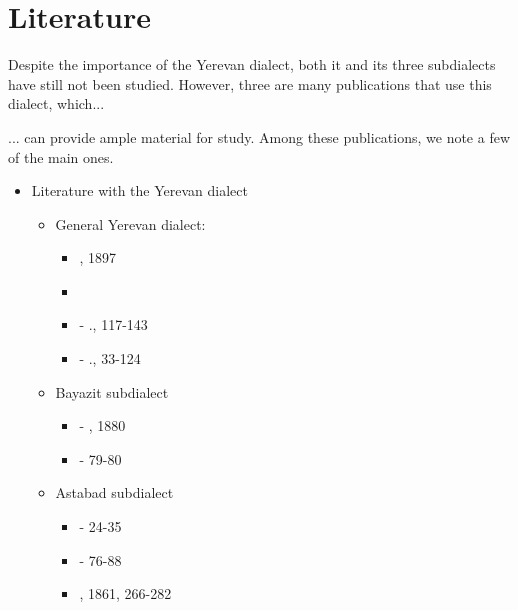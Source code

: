 \section{Literature}

Despite the importance of the Yerevan dialect, both it and its three subdialects have still not been studied. However, three are many publications that use this dialect, which... 

\begin{adjarianpage}\label{page:47}\end{adjarianpage}%

... can provide ample material for study. Among these publications, we note a few of the main ones.

{\litoverview}

\begin{itemize}
	\item Literature with the Yerevan dialect
	\begin{itemize}
		\item General Yerevan dialect:
		\begin{itemize} 
			\item {}, 1897
\item {}
			\item {} - .,  117-143
			\item {} - .,  33-124
		\end{itemize}
		\item Bayazit subdialect
		\begin{itemize} 
			\item {} - , 1880
			\item {} -  79-80
		\end{itemize}
		\item Astabad subdialect
		\begin{itemize} 
			\item {} -  24-35
			\item {} -  76-88
			\item {}, 1861,  266-282

\end{itemize}
\end{itemize}
\end{itemize}
